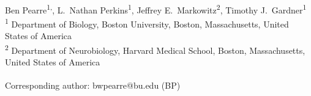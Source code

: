 \documentclass[10pt,letterpaper]{article}
\date{}
\begin{document}
\vspace*{0.35in}

\begin{flushleft}
{\Large
\textbf{}
}
\newline
\\
Ben Pearre\textsuperscript{1,\textcurrency},
L.~Nathan Perkins\textsuperscript{1},
Jeffrey E.~Markowitz\textsuperscript{2},
Timothy J.~Gardner\textsuperscript{1}
\\
\bigskip
\textsuperscript{1} Department of Biology, Boston University, Boston, Massachusetts, United States of America\\
\textsuperscript{2} Department of Neurobiology, Harvard Medical School, Boston, Massachusetts, United States of America
\\
\bigskip

% 
%






\textsuperscript{\textcurrency} Corresponding author: bwpearre@bu.edu (BP)

\end{flushleft}
\end{document}
